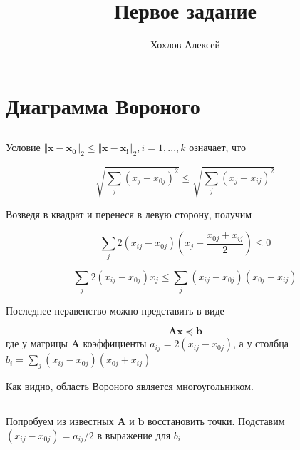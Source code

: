 
\title{Первое задание}
\author{
 	Хохлов Алексей \\
}
		

	\maketitle
	
	\section{Диаграмма Вороного}
	
	\subsection{}
	
	Условие $\Vert \mathbf{x} - \mathbf{x_0} \Vert_2 \leqslant \Vert \mathbf{x} - \mathbf{x_i} \Vert_2 , i=1,...,k$ означает, что
	
	\begin{equation}
	\sqrt {\sum_j (x_j-x_{0j})^2 }\leqslant \sqrt {\sum_j (x_j-x_{ij})^2 }
	\end{equation}
	
	Возведя в квадрат и перенеся в левую сторону, получим
	
	\begin{equation}
	\sum_j 2(x_{ij}-x_{0j})(x_j - \frac{x_{0j}+x_{ij}}{2}) \leqslant 0
	\end{equation}
	
	\begin{equation}
	\sum_j 2(x_{ij}-x_{0j})x_j \leqslant  	\sum_j (x_{ij}-x_{0j}) (x_{0j}+x_{ij}) 
	\end{equation}
	
	Последнее неравенство можно представить в виде
	
	\begin{equation}
	\mathbf{A} \mathbf{x} \preceq \mathbf{b}
	\end{equation}
	где у матрицы $\mathbf{A}$ коэффициенты $ a_{ij} = 2(x_{ij}-x_{0j})$, а у столбца $ b_i = \sum\limits_{j} (x_{ij}-x_{0j}) (x_{0j}+x_{ij}) $
	
	Как видно, область Вороного является многоугольником.
	
	\subsection{}
	
	Попробуем из известных $\mathbf{A}$ и $\mathbf{b}$ восстановить точки. Подставим $ (x_{ij}-x_{0j}) = a_{ij}/2$ в выражение для $b_i$
	

